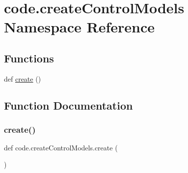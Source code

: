 \hypertarget{namespacecode_1_1create_control_models}{}\section{code.\+create\+Control\+Models Namespace Reference}
\label{namespacecode_1_1create_control_models}
\subsection*{Functions}
\begin{DoxyCompactItemize}
\item 
def \hyperlink{namespacecode_1_1create_control_models_a70f9fdc36d330f76369ea6fd7ebbcf9e}{create} ()
\end{DoxyCompactItemize}


\subsection{Function Documentation}
\mbox{\label{namespacecode_1_1create_control_models_a70f9fdc36d330f76369ea6fd7ebbcf9e}} 
\subsubsection{\texorpdfstring{create()}{create()}}
{\footnotesize\ttfamily def code.\+create\+Control\+Models.\+create (\begin{DoxyParamCaption}{ }\end{DoxyParamCaption})}

